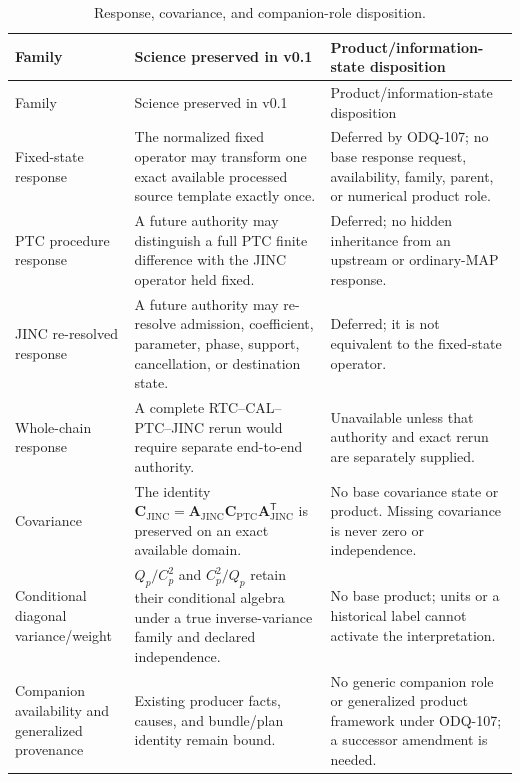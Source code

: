 \documentclass[11pt]{article}
\begin{document}
\begin{longtable}{@{}>{\raggedright\arraybackslash}p{}
                        >{\raggedright\arraybackslash}p{}
                        >{\raggedright\arraybackslash}p{}@{}}
\caption{Response, covariance, and companion-role disposition.}
\label{tab:deferred-companions}\\
\toprule
Family & Science preserved in v0.1 & Product/information-state disposition \\
\midrule
\endfirsthead
\toprule
Family & Science preserved in v0.1 & Product/information-state disposition \\
\midrule
\endhead
Fixed-state response & The normalized fixed operator may transform one exact
available processed source template exactly once. & Deferred by ODQ-107; no
base response request, availability, family, parent, or numerical product
role. \\
PTC procedure response & A future authority may distinguish a full PTC
finite difference with the JINC operator held fixed. & Deferred; no hidden
inheritance from an upstream or ordinary-MAP response. \\
JINC re-resolved response & A future authority may re-resolve admission,
coefficient, parameter, phase, support, cancellation, or destination state. &
Deferred; it is not equivalent to the fixed-state operator. \\
Whole-chain response & A complete RTC--CAL--PTC--JINC rerun would require
separate end-to-end authority. & Unavailable unless that authority and exact
rerun are separately supplied. \\
Covariance & The identity
$\mathbf C_{\mathrm{JINC}}=\mathbf A_{\mathrm{JINC}}
\mathbf C_{\mathrm{PTC}}\mathbf A_{\mathrm{JINC}}^{\mathsf T}$ is preserved
on an exact available domain. & No base covariance state or product. Missing
covariance is never zero or independence. \\
Conditional diagonal variance/weight & $Q_p/C_p^2$ and $C_p^2/Q_p$ retain
their conditional algebra under a true inverse-variance family and declared
independence. & No base product; units or a historical label cannot activate
the interpretation. \\
Companion availability and generalized provenance & Existing producer facts,
causes, and bundle/plan identity remain bound. & No generic companion role or
generalized product framework under ODQ-107; a successor amendment is needed.
\\
\bottomrule
\end{longtable}
\end{document}
